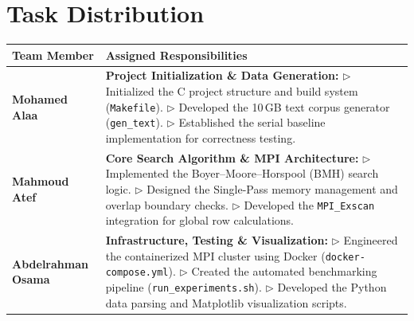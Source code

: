 \documentclass[11pt,a4paper]{article}
\begin{document}
\vspace{0.4cm}
\section{Task Distribution}

\begin{center}
\begin{tcolorbox}[width=0.95\textwidth,
  colback=lightgray, colframe=primary,
  boxrule=0.8pt, arc=4pt,
  title={\color{white}\bfseries Team Workload Distribution},colbacktitle=primary]
\centering
\small
\renewcommand{\arraystretch}{1.4}
\begin{tabular}{p{3.5cm} p{10cm}}
\toprule
\textbf{Team Member} & \textbf{Assigned Responsibilities} \\
\midrule
\textbf{Mohamed Alaa} & \textbf{Project Initialization \& Data Generation:} \newline
$\triangleright$ Initialized the C project structure and build system (\texttt{Makefile}). \newline
$\triangleright$ Developed the 10\,GB text corpus generator (\texttt{gen\_text}). \newline
$\triangleright$ Established the serial baseline implementation for correctness testing. \\
\midrule
\textbf{Mahmoud Atef} & \textbf{Core Search Algorithm \& MPI Architecture:} \newline
$\triangleright$ Implemented the Boyer--Moore--Horspool (BMH) search logic. \newline
$\triangleright$ Designed the Single-Pass memory management and overlap boundary checks. \newline
$\triangleright$ Developed the \texttt{MPI\_Exscan} integration for global row calculations. \\
\midrule
\textbf{Abdelrahman Osama} & \textbf{Infrastructure, Testing \& Visualization:} \newline
$\triangleright$ Engineered the containerized MPI cluster using Docker (\texttt{docker-compose.yml}). \newline
$\triangleright$ Created the automated benchmarking pipeline (\texttt{run\_experiments.sh}). \newline
$\triangleright$ Developed the Python data parsing and Matplotlib visualization scripts. \\
\bottomrule
\end{tabular}
\end{tcolorbox}
\end{center}
\end{document}

